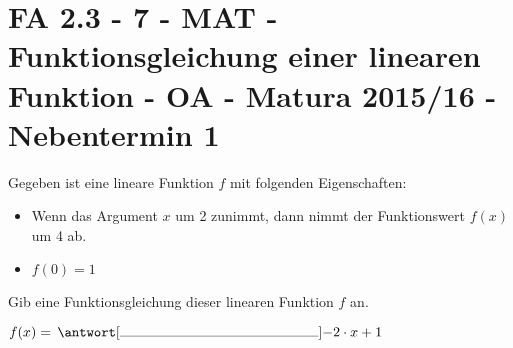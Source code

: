 \section{FA 2.3 - 7 - MAT - Funktionsgleichung einer linearen Funktion - OA - Matura 2015/16 - Nebentermin 1}

\begin{beispiel}[FA 2.3]{1} %
Gegeben ist eine lineare Funktion $f$ mit folgenden Eigenschaften:

\begin{itemize}
	\item Wenn das Argument $x$ um 2 zunimmt, dann nimmt der Funktionswert $f(x)$ um 4 ab.
	\item $f(0)=1$
\end{itemize} 


Gib eine Funktionsgleichung dieser linearen Funktion $f$ an. \leer

$f(x)=\,\antwort[\rule{5cm}{0.3pt}]{-2\cdot x +1}$
\end{beispiel}